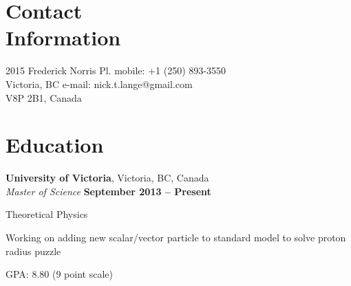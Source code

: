 \documentclass[margin,line]{resume}
\begin{document}
\begin{resume}

    \section{\mysidestyle Contact\\Information}

    2015 Frederick Norris Pl.   \hfill mobile: +1 (250) 893-3550          \vspace{0mm}\\\vspace{0mm}%
    Victoria, BC                \hfill e-mail: nick.t.lange@gmail.com     \vspace{0mm}\\\vspace{0mm}%
    V8P 2B1, Canada             \hfill   \vspace{0mm}\\\vspace{-4.5mm}%



    \section{\mysidestyle Education}

    \textbf{University of Victoria}, Victoria, BC, Canada \vspace{2mm}\\\vspace{1mm}%
    \textsl{Master of Science} \hfill \textbf{ September 2013 -- Present}\vspace{-3mm}\\\vspace{-1mm}%
    \begin{list2}
        \item Theoretical Physics
        \item Working on adding new scalar/vector particle to standard model to solve proton radius puzzle
        \item GPA: 8.80 (9 point scale)
    \end{list2}\vspace{2mm}


\end{resume}
\end{document}
